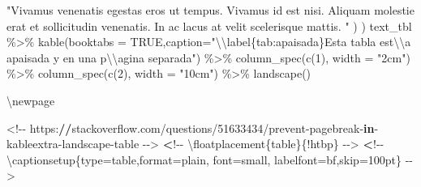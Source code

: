\documentclass[11pt,a4paper,oneside,]{article}
\newenvironment{Shaded}{\begin{snugshade}}{\end{snugshade}}
\newcommand{\AttributeTok}[1]{\textcolor[rgb]{0.77,0.63,0.00}{#1}}
\newcommand{\ControlFlowTok}[1]{\textcolor[rgb]{0.13,0.29,0.53}{\textbf{#1}}}
\newcommand{\DecValTok}[1]{\textcolor[rgb]{0.00,0.00,0.81}{#1}}
\newcommand{\ErrorTok}[1]{\textcolor[rgb]{0.64,0.00,0.00}{\textbf{#1}}}
\newcommand{\NormalTok}[1]{#1}
\newcommand{\OtherTok}[1]{\textcolor[rgb]{0.56,0.35,0.01}{#1}}
\newcommand{\SpecialCharTok}[1]{\textcolor[rgb]{0.00,0.00,0.00}{#1}}
\newcommand{\StringTok}[1]{\textcolor[rgb]{0.31,0.60,0.02}{#1}}
\numberwithin{dummy}{section}
\theoremstyle{ocrenumbox}
\theoremstyle{blacknumex}
\theoremstyle{blacknumbox}
\theoremstyle{ocrenum}
\theoremstyle{ocrenum}
\begin{document}
\begin{Shaded}
\begin{Highlighting}[numbers=left,,firstnumber=701,]
\AttributeTok{    "Vivamus venenatis egestas eros ut tempus. Vivamus id est nisi.}
\AttributeTok{    Aliquam molestie erat et sollicitudin venenatis. In ac lacus at}
\AttributeTok{    velit scelerisque mattis. "}
\AttributeTok{    ) }
\AttributeTok{  )}
\AttributeTok{text\_tbl \%\textgreater{}\%}
\AttributeTok{  kable(booktabs = TRUE,caption="}\SpecialCharTok{\textbackslash{}\textbackslash{}}\AttributeTok{label\{tab:apaisada\}Esta tabla }
\AttributeTok{          est}\SpecialCharTok{\textbackslash{}\textbackslash{}}\AttributeTok{\textquotesingle{}a apaisada y en una p}\SpecialCharTok{\textbackslash{}\textbackslash{}}\AttributeTok{\textquotesingle{}agina separada") \%\textgreater{}\% }
\AttributeTok{      column\_spec(c(1), }
\AttributeTok{          width = "2cm") \%\textgreater{}\% }
\AttributeTok{      column\_spec(c(2), }
\AttributeTok{          width = "10cm") \%\textgreater{}\% }
\AttributeTok{      landscape()}

\StringTok{\textasciigrave{}\textasciigrave{}\textasciigrave{}}



\NormalTok{\textbackslash{}newpage}

\SpecialCharTok{\textless{}!{-}{-}}\NormalTok{ https}\SpecialCharTok{:}\ErrorTok{//}\NormalTok{stackoverflow.com}\SpecialCharTok{/}\NormalTok{questions}\SpecialCharTok{/}\DecValTok{51633434}\SpecialCharTok{/}\NormalTok{prevent}\SpecialCharTok{{-}}\NormalTok{pagebreak}\SpecialCharTok{{-}}\ControlFlowTok{in}\SpecialCharTok{{-}}\NormalTok{kableextra}\SpecialCharTok{{-}}\NormalTok{landscape}\SpecialCharTok{{-}}\NormalTok{table }\SpecialCharTok{{-}}\OtherTok{{-}\textgreater{}}
\ErrorTok{\textless{}}\SpecialCharTok{!{-}{-}}\NormalTok{ \textbackslash{}floatplacement\{table\}\{}\SpecialCharTok{!}\NormalTok{htbp\} }\SpecialCharTok{{-}}\OtherTok{{-}\textgreater{}}
\ErrorTok{\textless{}}\SpecialCharTok{!{-}{-}}\NormalTok{ \textbackslash{}captionsetup\{type}\OtherTok{=}\NormalTok{table,format}\OtherTok{=}\NormalTok{plain, font}\OtherTok{=}\NormalTok{small, labelfont}\OtherTok{=}\NormalTok{bf,skip}\OtherTok{=}\NormalTok{100pt\} }\SpecialCharTok{{-}}\OtherTok{{-}\textgreater{}}


\end{Highlighting}
\end{Shaded}
\end{document}

